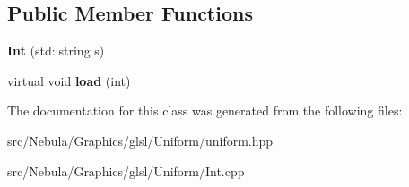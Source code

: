 \subsection*{\-Public \-Member \-Functions}
\begin{DoxyCompactItemize}
\item 
\hypertarget{classNeb_1_1glsl_1_1Uniform_1_1Scalar_1_1Int_afc2e77242ed6bbb588978085f515a7bf}{{\bfseries \-Int} (std\-::string s)}\label{classNeb_1_1glsl_1_1Uniform_1_1Scalar_1_1Int_afc2e77242ed6bbb588978085f515a7bf}

\item 
\hypertarget{classNeb_1_1glsl_1_1Uniform_1_1Scalar_1_1Int_a2b305a726c152de60547518b9ed48a2a}{virtual void {\bfseries load} (int)}\label{classNeb_1_1glsl_1_1Uniform_1_1Scalar_1_1Int_a2b305a726c152de60547518b9ed48a2a}

\end{DoxyCompactItemize}


\-The documentation for this class was generated from the following files\-:\begin{DoxyCompactItemize}
\item 
src/\-Nebula/\-Graphics/glsl/\-Uniform/uniform.\-hpp\item 
src/\-Nebula/\-Graphics/glsl/\-Uniform/\-Int.\-cpp\end{DoxyCompactItemize}

